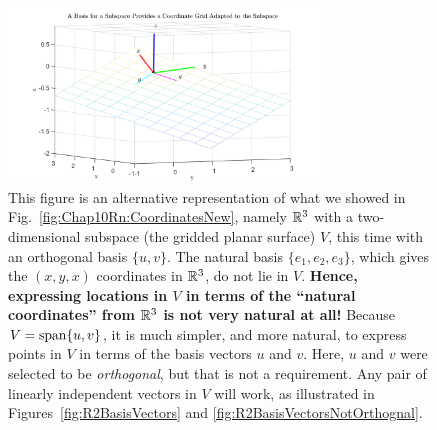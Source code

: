\begin{figure}[th!]
\centering
\includegraphics[width=0.75\textwidth]{graphics/Chap10Rn/SubspaceBasis.png}
\caption{This figure is an alternative representation of what we showed in Fig.~\ref{fig:Chap10Rn:CoordinatesNew}, namely $\mathbb R^3$ with a two-dimensional subspace (the gridded planar surface) $V$, this time with an orthogonal basis $\{u, v\}$. The natural basis $\{ e_1, e_2, e_3\}$, which gives the $(x, y, x)$ coordinates in $\mathbb R^3$, do not lie in $V$. \textbf{Hence, expressing locations in $V$ in terms of the ``natural coordinates'' from $\mathbb R^3$ is not very natural at all!} Because $V=\mathrm{span} \{ u, v \}$, it is much simpler, and more natural, to express points in $V$ in terms of the basis vectors $u$ and $v$. Here, $u$ and $v$ were selected to be \textit{orthogonal}, but that is not a requirement. Any pair of linearly independent vectors in $V$ will work, as illustrated in Figures~\ref{fig:R2BasisVectors} and \ref{fig:R2BasisVectorsNotOrthognal}.}
    \label{fig:Chap10Rn:Coordinates}
\end{figure}



